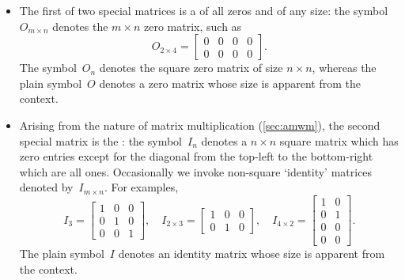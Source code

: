 \begin{itemize}
\item The first of two special matrices is a  of all zeros and of any size: the symbol~\(O_{m\times n}\) denotes the \(m\times n\) zero matrix, such as
\begin{equation*}
O_{2\times 4}=\begin{bmatrix} 0&0&0&0\\0&0&0&0 \end{bmatrix}.
\end{equation*}
The symbol~\(O_n\) denotes the square zero matrix of size \(n\times n\), whereas the plain symbol~\(O\) denotes a zero matrix whose size is apparent from the context.

\item Arising from the nature of matrix multiplication (\autoref{sec:amwm}), the second special matrix is the : the symbol~\(I_n\) denotes a \(n\times n\) square matrix which has zero entries except for the diagonal from the top-left to the bottom-right which are all ones.
Occasionally we invoke non-square `identity' matrices denoted by~\(I_{m\times n}\).
For examples,
\begin{equation*}
I_3=\begin{bmatrix} 1&0&0\\0&1&0\\0&0&1 \end{bmatrix},\quad
I_{2\times3}=\begin{bmatrix} 1&0&0\\0&1&0\end{bmatrix},\quad
I_{4\times2}=\begin{bmatrix} 1&0\\0&1\\0&0\\0&0\end{bmatrix}.
\end{equation*}
The plain symbol~\(I\) denotes an identity matrix whose size is apparent from the context.


\end{itemize}
